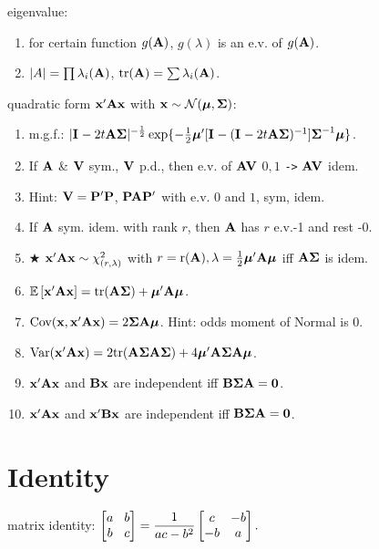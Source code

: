eigenvalue: \begin{enumerate}
    \item for certain function $g(\bA)$, $g(\lambda)$ is an e.v. of $g(\bA)$.
    \item $|A| = \prod \lambda_i(\bA)$, $\tr{\bA} = \sum \lambda_i(\bA)$.
\end{enumerate}

quadratic form $\bx'\bA \bx$ with $\bx \sim \norm{\bmu}{\bSigma}$: \begin{enumerate}
    \item m.g.f.: $|\bI{} - 2t\bA\bSigma|^{-\frac{1}{2}}\exp\{-\frac{1}{2}\bmu'[\bI{} - (\bI{} - 2t\bA\bSigma)^{-1}]\bSigma^{-1}\bmu\}$.
    \item If $\bA$ \& $\bV$ sym., $\bV$ p.d., then e.v. of $\bA\bV$ $0, 1$ \verb|->| $\bA\bV$ idem. 
    \item [] Hint: $\bV = \bP'\bP$, $\bP \bA \bP'$ with e.v. $0$ and $1$, sym, idem.
    \item If $\bA$ sym. idem. with rank $r$, then $\bA$ has $r$ e.v.-1 and rest -0.
    \item $\bigstar$ $\bx'\bA\bx \sim \chi^2_{(r, \lambda)}$ with $r = \rk{\bA}, \lambda = \frac{1}{2}\bmu'\bA\bmu$ iff $\bA\bSigma$ is idem.
    \item $\bE{\bx'\bA\bx} = \tr{\bA\bSigma} + \bmu' \bA \bmu$.
    \item [] $\cov{\bx}{\bx'\bA\bx} = 2\bSigma\bA\bmu$. Hint: odds moment of Normal is 0.
    \item [] $\var{\bx'\bA\bx} = 2\tr{\bA\bSigma\bA\bSigma} + 4\bmu'\bA\bSigma\bA\bmu$.
    \item $\bx'\bA\bx$ and $\bB \bx$ are independent iff $\bB \bSigma \bA = \bzero$.
    \item $\bx'\bA\bx$ and $\bx' \bB \bx$ are independent iff $\bB \bSigma \bA = \bzero$.
\end{enumerate}

\section*{Identity}

matrix identity: $
    \setlength\arraycolsep{1ex}
    \begin{bmatrix}
        a & b \\
        b & c \\
    \end{bmatrix}
    = \dfrac{1}{ac-b^2} 
    \begin{bmatrix}
        c & -b \\
        -b & a \\
    \end{bmatrix}.
$

